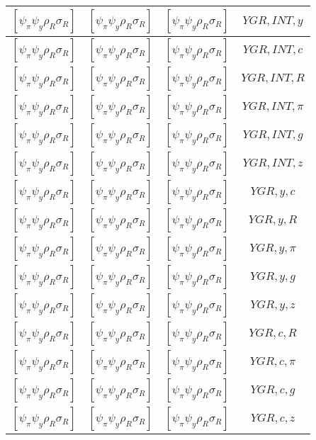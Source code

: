 \documentclass[a4paper,10pt]{article}
\begin{document}
\begin{longtable}{|c|c|c|c|}
\hline
$[\psi_\pi \psi_y \rho_R \sigma_R ]$ & $[\psi_\pi \psi_y \rho_R \sigma_R ]$ & $[\psi_\pi \psi_y \rho_R \sigma_R ]$ & ${YGR},{INT},{y}$ \\
\hline
$[\psi_\pi \psi_y \rho_R \sigma_R ]$ & $[\psi_\pi \psi_y \rho_R \sigma_R ]$ & $[\psi_\pi \psi_y \rho_R \sigma_R ]$ & ${YGR},{INT},{c}$ \\
\hline
$[\psi_\pi \psi_y \rho_R \sigma_R ]$ & $[\psi_\pi \psi_y \rho_R \sigma_R ]$ & $[\psi_\pi \psi_y \rho_R \sigma_R ]$ & ${YGR},{INT},{R}$ \\
\hline
$[\psi_\pi \psi_y \rho_R \sigma_R ]$ & $[\psi_\pi \psi_y \rho_R \sigma_R ]$ & $[\psi_\pi \psi_y \rho_R \sigma_R ]$ & ${YGR},{INT},{\pi}$ \\
\hline
$[\psi_\pi \psi_y \rho_R \sigma_R ]$ & $[\psi_\pi \psi_y \rho_R \sigma_R ]$ & $[\psi_\pi \psi_y \rho_R \sigma_R ]$ & ${YGR},{INT},{g}$ \\
\hline
$[\psi_\pi \psi_y \rho_R \sigma_R ]$ & $[\psi_\pi \psi_y \rho_R \sigma_R ]$ & $[\psi_\pi \psi_y \rho_R \sigma_R ]$ & ${YGR},{INT},{z}$ \\
\hline
$[\psi_\pi \psi_y \rho_R \sigma_R ]$ & $[\psi_\pi \psi_y \rho_R \sigma_R ]$ & $[\psi_\pi \psi_y \rho_R \sigma_R ]$ & ${YGR},{y},{c}$ \\
\hline
$[\psi_\pi \psi_y \rho_R \sigma_R ]$ & $[\psi_\pi \psi_y \rho_R \sigma_R ]$ & $[\psi_\pi \psi_y \rho_R \sigma_R ]$ & ${YGR},{y},{R}$ \\
\hline
$[\psi_\pi \psi_y \rho_R \sigma_R ]$ & $[\psi_\pi \psi_y \rho_R \sigma_R ]$ & $[\psi_\pi \psi_y \rho_R \sigma_R ]$ & ${YGR},{y},{\pi}$ \\
\hline
$[\psi_\pi \psi_y \rho_R \sigma_R ]$ & $[\psi_\pi \psi_y \rho_R \sigma_R ]$ & $[\psi_\pi \psi_y \rho_R \sigma_R ]$ & ${YGR},{y},{g}$ \\
\hline
$[\psi_\pi \psi_y \rho_R \sigma_R ]$ & $[\psi_\pi \psi_y \rho_R \sigma_R ]$ & $[\psi_\pi \psi_y \rho_R \sigma_R ]$ & ${YGR},{y},{z}$ \\
\hline
$[\psi_\pi \psi_y \rho_R \sigma_R ]$ & $[\psi_\pi \psi_y \rho_R \sigma_R ]$ & $[\psi_\pi \psi_y \rho_R \sigma_R ]$ & ${YGR},{c},{R}$ \\
\hline
$[\psi_\pi \psi_y \rho_R \sigma_R ]$ & $[\psi_\pi \psi_y \rho_R \sigma_R ]$ & $[\psi_\pi \psi_y \rho_R \sigma_R ]$ & ${YGR},{c},{\pi}$ \\
\hline
$[\psi_\pi \psi_y \rho_R \sigma_R ]$ & $[\psi_\pi \psi_y \rho_R \sigma_R ]$ & $[\psi_\pi \psi_y \rho_R \sigma_R ]$ & ${YGR},{c},{g}$ \\
\hline
$[\psi_\pi \psi_y \rho_R \sigma_R ]$ & $[\psi_\pi \psi_y \rho_R \sigma_R ]$ & $[\psi_\pi \psi_y \rho_R \sigma_R ]$ & ${YGR},{c},{z}$ \\

\end{longtable}
\end{document}
